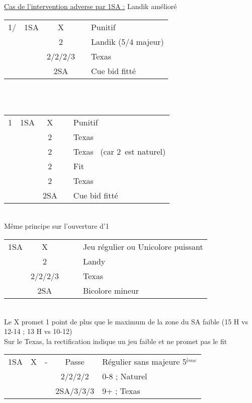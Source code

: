 \documentclass[a4paper, oneside, 11pt]{report}
\begin{document}
	\underline{Cas de l'intervention adverse par 1SA :} Landik amélioré\\
	\begin{tabular}{cccc|l}
	1\trefle/\carreau & 1SA & X && Punitif\\
	&& 2\trefle && Landik (5/4 majeur)\\
	&& 2\carreau/2\coeur/2\pique/3\trefle && Texas\\
	&& 2SA && Cue bid fitté\\
	\end{tabular}\\\\

	\begin{tabular}{cccc|l}
	1\coeur & 1SA & X && Punitif\\
	&& 2\trefle && Texas \carreau\\
	&& 2\carreau && Texas \pique\ (car 2\coeur\ est naturel)\\
	&& 2\coeur && Fit\\
	&& 2\pique && Texas \trefle\\
	&& 2SA && Cue bid fitté\\
	\end{tabular}\\
	Même principe sur l'ouverture d'1\pique\\

	\begin{tabular}{cccc|l}
	1SA & X &&& Jeu régulier ou Unicolore puissant\\
	& 2\trefle &&& Landy\\
	& 2\carreau/2\coeur/2\pique/3\trefle &&& Texas\\
	& 2SA &&& Bicolore mineur\\
	\end{tabular}\\
	Le X promet 1 point de plus que le maximum de la zone du SA faible (15 H vs 12-14 ; 13 H vs 10-12)\\
	Sur le Texas, la rectification indique un jeu faible et ne promet pas le fit\\

	\begin{tabular}{cccc|l}
	1SA & X & - & Passe & Régulier sans majeure 5$^{ème}$\\
	&&& 2\trefle/2\carreau/2\coeur/2\pique & 0-8 ; Naturel\\
	&&& 2SA/3\trefle/3\carreau/3\coeur & 9+ ; Texas\\
	\end{tabular}\\\\
\end{document}
